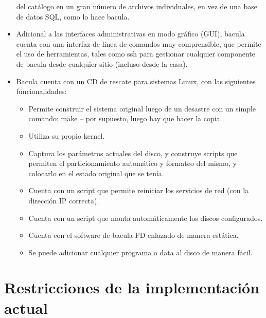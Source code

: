 \begin{itemize}
   del catálogo en un gran número de archivos individuales, en vez de una base de datos
   SQL, como lo hace bacula.  
\item Adicional a las interfaces administrativas en modo gráfico (GUI), bacula cuenta con
   una interfaz de línea de comandos muy comprensible, que permite el uso de herramientas,
   tales como ssh para gestionar cualquier componente de bacula desde cualquier sitio (incluso
   desde la casa). 
\item Bacula cuenta con un CD de rescate para sistemas Linux, con las siguientes funcionalidades: 
   \begin{itemize}
   \item Permite construir el sistema original luego de un desastre con un simple comando:
      make -- por supuesto, luego hay que hacer la copia. 
   \item Utiliza su propio kernel. 
   \item Captura los parámetros actuales del disco, y construye scripts que permiten el particionamiento
      automático y formateo del mismo, y colocarlo en el estado original que se tenía.
   \item Cuenta con un script que permite reiniciar los servicios de red (con la dirección
      IP correcta).
   \item Cuenta con un script que monta automáticamente los discos configurados.  
   \item Cuenta con el software de bacula FD enlazado de manera estática. 
   \item Se puede adicionar cualquier programa o data al disco de manera fácil.  
   \end{itemize}

\end{itemize}

\section{Restricciones de la implementación actual}


